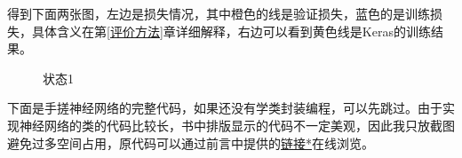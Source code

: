 \documentclass[a5paper, 11pt]{ctexbook}
\begin{document}
得到下面两张图，左边是损失情况，其中橙色的线是验证损失，蓝色的是训练损失，具体含义在第\ref{评价方法}章详细解释，右边可以看到黄色线是Keras的训练结果。

\begin{figure}[ht]
    \centering
    \caption{状态1}\label{状态1}
\end{figure}



下面是手搓神经网络的完整代码，如果还没有学类封装编程，可以先跳过。由于实现神经网络的类的代码比较长，书中排版显示的代码不一定美观，因此我只放截图避免过多空间占用，原代码可以通过前言中提供的\href{https://github.com/Aegis1863/ML_practice/blob/master/机器学习笔记/X_01_手搓BP神经网络.ipynb}{链接*}在线浏览。

\newpage
\end{document}
